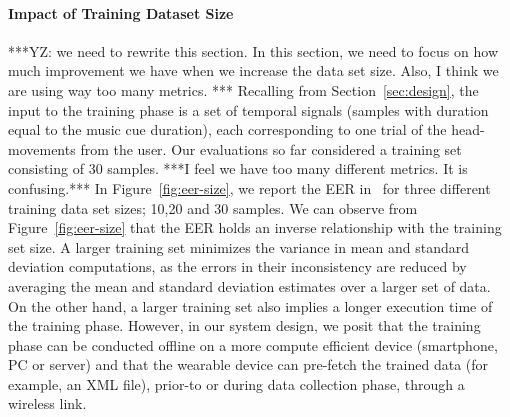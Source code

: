 \paragraph{Impact of Training Dataset Size}

***YZ: we need to rewrite this section. In this section, we need to focus on how much improvement we have when we increase the data set size. Also, I think we are using way too many metrics. ***
Recalling from Section~\ref{sec:design}, the input to the training phase
is a set of temporal signals (samples with duration equal to the music cue
duration), each corresponding to one trial of the head-movements from the
user. Our evaluations so far considered a training set consisting of 30 samples.
***I feel we have too many different metrics. It is confusing.*** In Figure~\ref{fig:eer-size}, we report the EER in \systemname~for three
different training data set sizes; 10,20 and 30 samples.
We can observe from Figure~\ref{fig:eer-size} that the EER holds an inverse
relationship with the training set size. A larger training set minimizes the
variance in mean and standard deviation computations, as the errors in their
inconsistency are reduced by averaging the mean and standard deviation
estimates over a larger set of data.
On the other hand, a larger training set also implies a longer execution time
of the training phase.
However, in our system design, we posit that the training phase can be
conducted
offline on a more compute efficient device (smartphone, PC or server) and that
the wearable device can pre-fetch the trained data (for example, an XML file),
prior-to or during data collection phase, through a wireless link.


